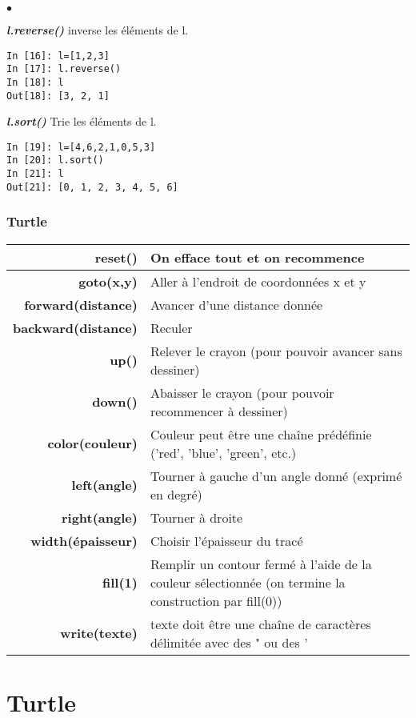 \documentclass[10pt,dvipsnames,  dvips]{article}
\begin{document}
\begin{list}{$\bullet$}{}
\item \textit{\textbf{l.reverse() }} inverse les éléments de l.
\begin{lstlisting}
In [16]: l=[1,2,3]
In [17]: l.reverse()
In [18]: l
Out[18]: [3, 2, 1]
\end{lstlisting}

\item \textit{\textbf{l.sort() }} Trie les éléments de l.
\begin{lstlisting}
In [19]: l=[4,6,2,1,0,5,3]
In [20]: l.sort()
In [21]: l
Out[21]: [0, 1, 2, 3, 4, 5, 6]
\end{lstlisting}
\end{list}



\newpage


\subsubsection*{Turtle}


\begin{tabular}[]{| r | >{\raggedright}m{12cm} |}
\hline \textbf{reset()} & On efface tout et on recommence  \tabularnewline
\hline \textbf{goto(x,y)} & Aller à l’endroit de coordonnées x et y  \tabularnewline
\hline \textbf{forward(distance)} & Avancer d’une distance donnée\tabularnewline
\hline \textbf{backward(distance)} & Reculer  \tabularnewline
\hline \textbf{up()}  &  Relever le crayon (pour pouvoir avancer sans dessiner)  \tabularnewline
\hline \textbf{down()}  & Abaisser le crayon (pour pouvoir recommencer à dessiner)  \tabularnewline
\hline \textbf{color(couleur)} &  Couleur peut être une chaîne prédéfinie (’red’, ’blue’, ’green’, etc.)  \tabularnewline
\hline \textbf{left(angle)}  & Tourner à gauche d’un angle donné (exprimé en degré)  \tabularnewline
\hline \textbf{right(angle)}  & Tourner à droite  \tabularnewline
\hline \textbf{width(épaisseur)}  & Choisir l’épaisseur du tracé  \tabularnewline
\hline \textbf{fill(1)}  & Remplir un contour fermé à l’aide de la couleur sélectionnée (on termine la construction par fill(0))  \tabularnewline
\hline \textbf{write(texte)}  &  texte doit être une chaîne de caractères délimitée avec des " ou des ’\tabularnewline
\hline
\end{tabular} 




\newpage


\section{Turtle}
\end{document}
